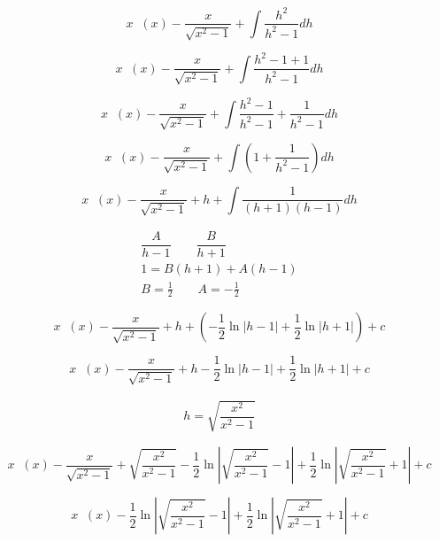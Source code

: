 \documentclass[12pt]{article}
\DeclareMathOperator{\seci}{sec^{-1}}
\begin{document}
\begin{center}
\begin{equation}
x\seci(x) -
\dfrac{x}{\sqrt{x^2 -1}}
+ \int{\dfrac{h^2}{h^2-1}} dh
\end{equation}

\begin{equation}
x\seci(x) -
\dfrac{x}{\sqrt{x^2 -1}}
+ \int{\dfrac{h^2 -1 +1}{h^2-1}} dh
\end{equation}

\begin{equation}
x\seci(x) -
\dfrac{x}{\sqrt{x^2 -1}}
+\int{\dfrac{h^2 -1}{h^2-1} + \dfrac{1}{h^2-1}} dh
\end{equation}

\begin{equation}
x\seci(x) -
\dfrac{x}{\sqrt{x^2 -1}}
+\int{\left (1 + \dfrac{1}{h^2-1} \right)} dh
\end{equation}

\begin{equation}
x\seci(x) -
\dfrac{x}{\sqrt{x^2 -1}}
+h
+\int{\dfrac{1}{(h+1)(h-1)}} dh
\end{equation}

\begin{gather}
\dfrac{A}{h-1} \qquad \dfrac{B}{h+1}\\
1=B(h+1)+A(h-1)\\
B = \frac{1}{2} \qquad A = -\frac{1}{2}
\end{gather}

\begin{equation}
x\seci(x) -
\dfrac{x}{\sqrt{x^2 -1}}
+h
+\left(-\frac{1}{2}\ln \left\lvert h-1 \right\rvert +\frac{1}{2}\ln \left\lvert h+1 \right\rvert \right) + c
\end{equation}

\begin{equation}
x\seci(x) -
\dfrac{x}{\sqrt{x^2 -1}}
+h
-\frac{1}{2}\ln \left\lvert h-1 \right\rvert + \frac{1}{2}\ln \left\lvert h+1 \right\rvert + c
\end{equation}

\begin{gather}
h = \sqrt{\dfrac{x^2}{x^2 - 1}}
\end{gather}

\begin{equation}
x\seci(x) -
\dfrac{x}{\sqrt{x^2 -1}}
+\sqrt{\dfrac{x^2}{x^2 - 1}}
-\frac{1}{2}\ln \left\lvert \sqrt{\dfrac{x^2}{x^2 - 1}}-1 \right\rvert + \frac{1}{2}\ln \left\lvert \sqrt{\dfrac{x^2}{x^2 - 1}}+1 \right\rvert + c
\end{equation}

\begin{equation}
x\seci(x)
-\frac{1}{2}\ln \left\lvert \sqrt{\dfrac{x^2}{x^2 - 1}}-1 \right\rvert + \frac{1}{2}\ln \left\lvert \sqrt{\dfrac{x^2}{x^2 - 1}}+1 \right\rvert + c
\end{equation}

\end{center}
\end{document}
